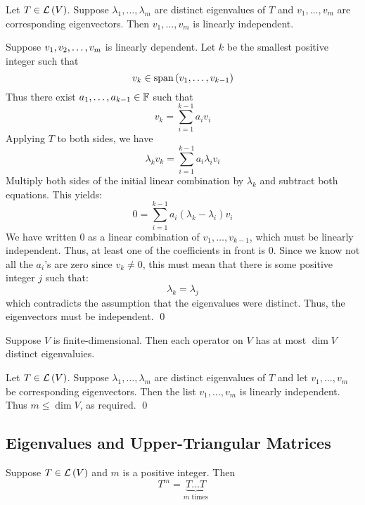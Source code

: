\begin{theorem} 
    Let $T \in \mathcal{L} \left( V \right)$. Suppose $\lambda_1, \dots, \lambda_m$ are distinct eigenvalues of $T$ and $v_1, \dots, v_m$
    are corresponding eigenvectors. Then $v_1, \dots, v_m$ is linearly independent.

    \begin{proof*}
        Suppose $v_1, v_2, \ldots, v_{m}$ is linearly dependent. Let $k$ be the smallest positive integer
        such that
        \[ v_k \in \operatorname{span}{(v_1, \dots, v_{k-1})} \]
        Thus there exist $a_1, \dots, a_{k-1} \in \operatorname{\mathbb{F}}$ such that
        \[ v_k = \sum_{i=1}^{k-1} a_i v_i \]
        Applying $T$ to both sides, we have
        \[ \lambda_k v_k = \sum_{i=1}^{k-1} a_i \lambda_i v_i \]
        Multiply both sides of the initial linear combination by $\lambda_k$ and subtract both equations.
        This yields:
        \[ 0 = \sum_{i=1}^{k-1} a_i (\lambda_k - \lambda_i) v_i \]
        We have written 0 as a linear combination of $v_1, \dots, v_{k-1}$, which must be linearly independent.
        Thus, at least one of the coefficients in front is 0. Since we know not all the $a_i$'s are zero since $v_k \neq 0$,
        this must mean that there is some positive integer $j$ such that:
        \[ \lambda_k = \lambda_j \]
        which contradicts the assumption that the eigenvalues were distinct. Thus, the eigenvectors must be
        independent. \qed
    \end{proof*}
\end{theorem}

\begin{theorem} 
    Suppose $V$ is finite-dimensional. Then each operator on $V$ has at most $\dim V$ distinct eigenvaluies.

    \begin{proof*}
        Let $T \in \mathcal{L} \left( V \right)$. Suppose $\lambda_1, \dots, \lambda_m$ are distinct eigenvalues of $T$ and let
        $v_1, \dots, v_m$ be corresponding eigenvectors. Then the list $v_1, \dots, v_m$ is linearly independent.
        Thus $m \leq \dim V$, as required. \qed
    \end{proof*}
\end{theorem}

\subsection{Eigenvalues and Upper-Triangular Matrices}

\begin{definition} 
    Suppose $T \in \mathcal{L} \left( V \right)$ and $m$ is a positive integer. Then
    \[ T^m = \underbrace{T \dots T}_{m \text{ times}} \]
\end{definition}

\endinput